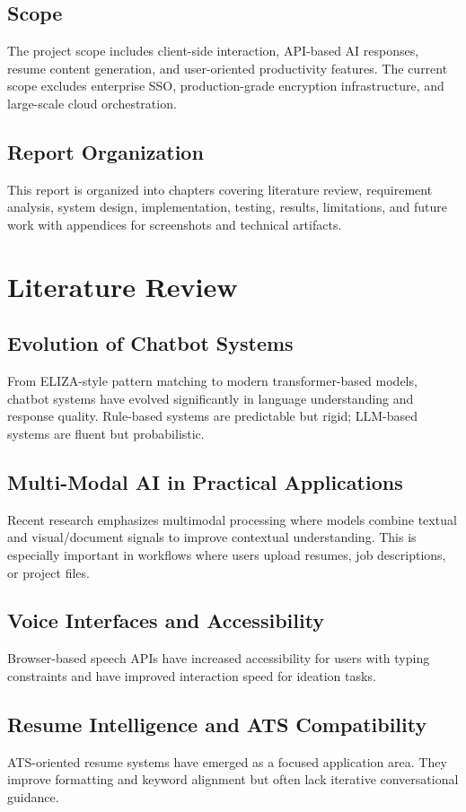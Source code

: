\documentclass[12pt,a4paper]{report}
\begin{document}
\section{Scope}
The project scope includes client-side interaction, API-based AI responses, resume content generation, and user-oriented productivity features. The current scope excludes enterprise SSO, production-grade encryption infrastructure, and large-scale cloud orchestration.

\section{Report Organization}
This report is organized into chapters covering literature review, requirement analysis, system design, implementation, testing, results, limitations, and future work with appendices for screenshots and technical artifacts.

\chapter{Literature Review}
\section{Evolution of Chatbot Systems}
From ELIZA-style pattern matching to modern transformer-based models, chatbot systems have evolved significantly in language understanding and response quality. Rule-based systems are predictable but rigid; LLM-based systems are fluent but probabilistic.

\section{Multi-Modal AI in Practical Applications}
Recent research emphasizes multimodal processing where models combine textual and visual/document signals to improve contextual understanding. This is especially important in workflows where users upload resumes, job descriptions, or project files.

\section{Voice Interfaces and Accessibility}
Browser-based speech APIs have increased accessibility for users with typing constraints and have improved interaction speed for ideation tasks.

\section{Resume Intelligence and ATS Compatibility}
ATS-oriented resume systems have emerged as a focused application area. They improve formatting and keyword alignment but often lack iterative conversational guidance.
\end{document}
